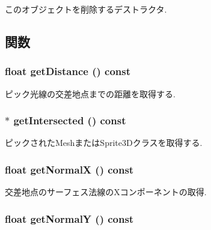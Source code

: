 このオブジェクトを削除するデストラクタ. 

\subsection{関数}
\hypertarget{classm3g_1_1RayIntersection_f024301f51d2ef67cac50e3255a49612}{
\subsubsection[{getDistance}]{\setlength{\rightskip}{0pt plus 5cm}float getDistance () const}}
\label{classm3g_1_1RayIntersection_f024301f51d2ef67cac50e3255a49612}


ピック光線の交差地点までの距離を取得する. \hypertarget{classm3g_1_1RayIntersection_cbf90cea6001c33cc03b5a737b312f62}{
\subsubsection[{getIntersected}]{ $\ast$ getIntersected () const}}
\label{classm3g_1_1RayIntersection_cbf90cea6001c33cc03b5a737b312f62}


ピックされたMeshまたはSprite3Dクラスを取得する. \hypertarget{classm3g_1_1RayIntersection_0ee7a8fab5e001b131bd3109da8af7fa}{
\subsubsection[{getNormalX}]{\setlength{\rightskip}{0pt plus 5cm}float getNormalX () const}}
\label{classm3g_1_1RayIntersection_0ee7a8fab5e001b131bd3109da8af7fa}


交差地点のサーフェス法線のXコンポーネントの取得. \hypertarget{classm3g_1_1RayIntersection_1e05e3b3e8d6b46462812e4713a63d18}{
\subsubsection[{getNormalY}]{\setlength{\rightskip}{0pt plus 5cm}float getNormalY () const}}
\label{classm3g_1_1RayIntersection_1e05e3b3e8d6b46462812e4713a63d18}


